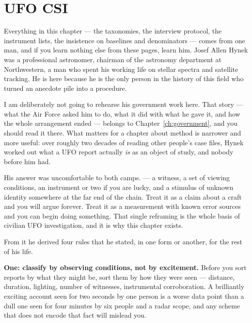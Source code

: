 \chapter{UFO CSI}\label{ch:ufocsi}


Everything in this chapter --- the taxonomies, the interview protocol, the instrument lists, the
insistence on baselines and denominators --- comes from one man, and if you learn nothing else
from these pages, learn him. Josef Allen Hynek was a professional astronomer, chairman of the
astronomy department at Northwestern, a man who spent his working life on stellar spectra and
satellite tracking. He is here because he is the only person in the history of this field who
turned an anecdote pile into a procedure.

I am deliberately not going to rehearse his government work here. That story --- what the Air
Force asked him to do, what it did with what he gave it, and how the whole arrangement ended ---
belongs to Chapter~\ref{ch:government}, and you should read it there. What matters for a chapter
about method is narrower and more useful: over roughly two decades of reading other people's
case files, Hynek worked out what a UFO report actually \emph{is} as an object of study, and
nobody before him had.

His answer was uncomfortable to both camps.  --- a witness, a set of viewing conditions, an instrument or
two if you are lucky, and a stimulus of unknown identity somewhere at the far end of the chain.
Treat it as a claim about a craft and you will argue forever. Treat it as a measurement with
known error sources and you can begin doing something. That single reframing is the whole basis
of civilian UFO investigation, and it is why this chapter exists.

From it he derived four rules that he stated, in one form or another, for the rest of his life.

\textbf{One: classify by observing conditions, not by excitement.} Before you sort reports by
what they might be, sort them by how they were seen --- distance, duration, lighting, number of
witnesses, instrumental corroboration. A brilliantly exciting account seen for two seconds by one
person is a worse data point than a dull one seen for four minutes by six people and a radar
scope, and any scheme that does not encode that fact will mislead you.

